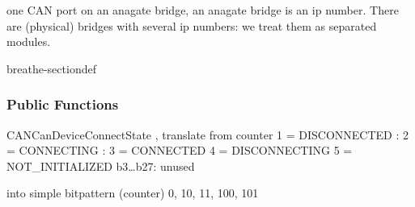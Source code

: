 \documentclass[a4paper,10pt,english]{sphinxmanual}
\begin{document}
\begin{fulllineitems}
\label{\detokenize{vendors/anagate:_CPPv410AnaCanScan}}%
\pysigstartmultiline
{}%
\pysigstopmultiline
\sphinxAtStartPar
one CAN port on an anagate bridge, an anagate bridge is an ip number. There are (physical) bridges with several ip numbers: we treat them as separated modules. 

\begin{sphinxuseclass}{breathe-sectiondef}\subsubsection*{Public Functions}

\begin{fulllineitems}
\label{\detokenize{vendors/anagate:_CPPv4N10AnaCanScan13getPortStatusEv}}%
\pysigstartmultiline
{}%
\pysigstopmultiline
\sphinxAtStartPar
CANCanDeviceConnectState , translate from counter 1 = DISCONNECTED : 2 = CONNECTING : 3 = CONNECTED 4 = DISCONNECTING 5 = NOT\_INITIALIZED b3…b27: unused

\sphinxAtStartPar
into simple bitpattern (counter) 0, 10, 11, 100, 101 

\end{fulllineitems}


\end{sphinxuseclass}
\end{fulllineitems}
\end{document}
